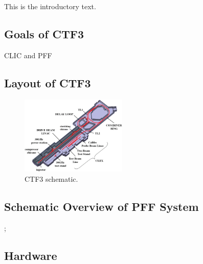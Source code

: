 
This is the introductory text.








\subsection{Goals of CTF3}
\label{ss:ctfGoals}

CLIC and PFF

\subsection{Layout of CTF3}
\label{ss:ctfLayout}

\begin{figure}
  \centering
  \includegraphics[width=0.45\textwidth]{Figures/ctfLayout}
  \caption{CTF3 schematic.}
  \label{f:ctfLayout}
\end{figure}


\subsection{Schematic Overview of PFF System}
\label{ss:ctfPFFLayout};

\subsection{Hardware}
\label{ss:ctfPFFHardware}


